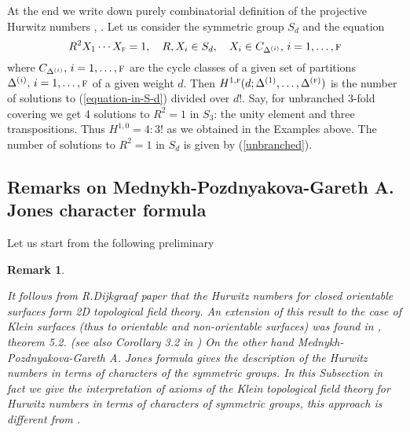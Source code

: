 \documentclass[a4paper,10pt]{article}
\theoremstyle{plain}
\newtheorem{Remark}{Remark}
\theoremstyle{remark}
\def\be{\begin{equation}}
\def\ee{\end{equation}}
\def\br{\begin{Remark}\rm\small}
\def\er{\end{Remark}}
\begin{document}
At the end we write down purely combinatorial definition of the projective Hurwitz numbers \cite{M2}, \cite{GARETH.A.JONES}.
Let us consider the symmetric group $S_d$ and  the equation
\be\label{equation-in-S-d}
R^2 X_1 \cdots X_{\textsc{f}} = 1,\quad R,X_i \in S_d,\quad X_i \in C_{\Delta^{(i)}},\, i=1,\dots,\textsc{f}
\ee
where $C_{\Delta^{(i)}},\, i=1,\dots,\textsc{f}$ are the cycle classes of a given set of partitions
$\Delta^{(i)},\,i=1,\dots,\textsc{f}$ of a given weight $d$. Then
$H^{1,\textsc{f}}(d;\Delta^{(1)},\dots,\Delta^{(\textsc{f})})$ is the number of solutions to (\ref{equation-in-S-d}) divided
over $d!$. Say, for unbranched 3-fold covering we get 4 solutions to $R^2=1$ in $S_3$: the unity element and three transpositions.
Thus $H^{1,0}=4:3!$ as we obtained in the Examples above. The number of solutions to $R^2=1$ in $S_d$ is given by
(\ref{unbranched}).


\subsection{Remarks on Mednykh-Pozdnyakova-Gareth A. Jones character formula\label{Remarks-on-Mednykh-subsection}}


Let us start from the following preliminary
\br\label{Natanzon}

It follows from R.Dijkgraaf paper \cite{Dijkgraaf} that the Hurwitz numbers for closed orientable surfaces form 2D topological field theory.
An extension of this result to the case of Klein surfaces (thus to orientable and non-orientable surfaces) was found in \cite{AN},
theorem 5.2. (see also Corollary 3.2 in \cite{AN2008}) On the other hand Mednykh-Pozdnyakova-Gareth A. Jones formula gives the description of
the Hurwitz numbers in terms of characters of the symmetric groups. In this Subsection in fact we give the interpretation  of axioms of
the Klein topological field theory \cite{AN} for Hurwitz numbers in terms of characters of symmetric groups, this approach is different
from \cite{AN}.

\er
\end{document}
